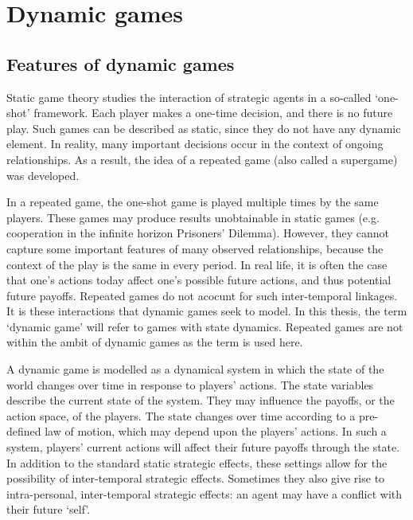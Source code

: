 \section{Dynamic games}

\label{sec:dynamic-games}

\subsection{Features of dynamic games}

\label{sec:feat-dynam-games} Static game theory studies the interaction of
strategic agents in a so-called `one-shot' framework. Each player makes a
one-time decision, and there is no future play. Such games can be described
as static, since they do not have any dynamic element. In reality, many
important decisions occur in the context of ongoing relationships. As a
result, the idea of a repeated game (also called a supergame) was developed.

In a repeated game, the one-shot game is played multiple times by the same
players. These games may produce results unobtainable in static games (e.g.
cooperation in the infinite horizon Prisoners' Dilemma). However, they
cannot capture some important features of many observed relationships,
because the context of the play is the same in every period. In real life,
it is often the case that one's actions today affect one's possible future
actions, and thus potential future payoffs. Repeated games do not acocunt
for such inter-temporal linkages. It is these interactions that dynamic
games seek to model. In this thesis, the term `dynamic game' will refer to
games with state dynamics. Repeated games are not within the ambit of
dynamic games as the term is used here.

A dynamic game is modelled as a dynamical system in which the state of the
world changes over time in response to players' actions. The state variables
describe the current state of the system. They may influence the payoffs, or
the action space, of the players. The state changes over time according to a
pre-defined law of motion, which may depend upon the players' actions. In
such a system, players' current actions will affect their future payoffs
through the state. In addition to the standard static strategic effects,
these settings allow for the possibility of inter-temporal strategic
effects. Sometimes they also give rise to intra-personal, inter-temporal
strategic effects: an agent may have a conflict with their future `self'.

